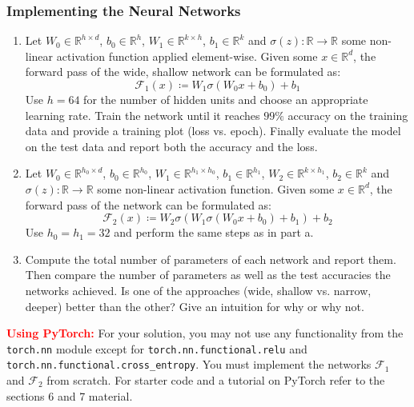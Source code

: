 \documentclass{article}
\begin{document}
\begin{aprob}
    \subsubsection*{Implementing the Neural Networks}
    \begin{enumerate}
        \item {}
        Let $W_0 \in \mathbb{R}^{h \times d}$, $b_0 \in \mathbb{R}^h$, $W_1 \in \mathbb{R}^{k \times h}$, $b_1 \in \mathbb{R}^k$ and $\sigma(z)\colon \mathbb{R} \to \mathbb{R}$
        some non-linear activation function applied element-wise. Given some $x \in \mathbb{R}^{d}$, the forward pass of the wide, shallow network can be formulated as:
        $$\mathcal{F}_1(x) \coloneqq W_1 \sigma(W_0 x + b_0) + b_1$$
        Use $h=64$ for the number of hidden units and choose an appropriate learning rate.
        Train the network until it reaches $99\%$ accuracy on the training data and provide a training plot (loss vs. epoch).
        Finally evaluate the model on the test data and report both the accuracy and the loss.
        \item {}
        Let $W_0 \in \mathbb{R}^{h_0 \times d}$, $b_0 \in \mathbb{R}^{h_0}$, $W_1 \in \mathbb{R}^{h_1 \times h_0}$, $b_1 \in \mathbb{R}^{h_1}$,
        $W_2 \in \mathbb{R}^{k \times h_1}$, $b_2 \in \mathbb{R}^{k}$ and $\sigma(z) : \mathbb{R} \rightarrow \mathbb{R}$
        some non-linear activation function. Given some $x \in \mathbb{R}^{d}$, the forward pass of the network can be formulated as:
        $$\mathcal{F}_2(x) \coloneqq W_2 \sigma(W_1 \sigma(W_0 x + b_0) + b_1) + b_2$$
        Use $h_0 = h_1 = 32$ and perform the same steps as in part a.
        \item {}
        Compute the total number of parameters of each network and report them.
        Then compare the number of parameters as well as the test accuracies the networks achieved. Is one of the approaches (wide, shallow vs. narrow, deeper) better than the other? Give
        an intuition for why or why not.
    \end{enumerate}
    
    \textcolor{red}{\textbf{Using PyTorch:}} For your solution, you may not use any functionality from the \texttt{torch.nn} module except for \texttt{torch.nn.functional.relu} and \texttt{torch.nn.functional.cross\_entropy}. You must implement the networks $\mathcal{F}_1$ and $\mathcal{F}_2$ from scratch. For starter code and a tutorial on PyTorch refer to the sections 6 and 7 material.

\end{aprob}
\end{document}
